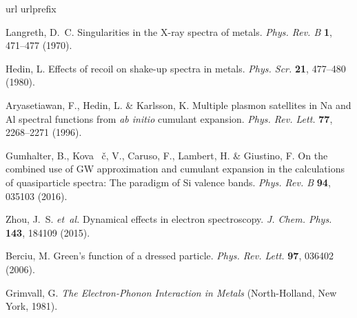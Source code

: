 \documentclass[12pt]{nature-mod}
\begin{document}
\begin{thebibliography}{10}
\expandafter\ifx\csname url\endcsname\relax
  \def\url#1{\texttt{#1}}\fi
\expandafter\ifx\csname urlprefix\endcsname\relax\def\urlprefix{URL }\fi
\providecommand{\bibinfo}[2]{#2}
\providecommand{\eprint}[2][]{\url{#2}}

\bibinfo{author}{Langreth, D.~C.}
\newblock \bibinfo{title}{Singularities in the {X}-ray spectra of metals}.
\newblock \emph{\bibinfo{journal}{Phys. Rev. B}} \textbf{\bibinfo{volume}{1}},
  \bibinfo{pages}{471--477} (\bibinfo{year}{1970}).

\bibinfo{author}{Hedin, L.}
\newblock \bibinfo{title}{Effects of recoil on shake-up spectra in metals}.
\newblock \emph{\bibinfo{journal}{Phys. Scr.}} \textbf{\bibinfo{volume}{21}},
  \bibinfo{pages}{477--480} (\bibinfo{year}{1980}).

\bibinfo{author}{Aryasetiawan, F.}, \bibinfo{author}{Hedin, L.} \&
  \bibinfo{author}{Karlsson, K.}
\newblock \bibinfo{title}{Multiple plasmon satellites in {Na} and {Al} spectral
  functions from \textit{ab initio} cumulant expansion}.
\newblock \emph{\bibinfo{journal}{Phys. Rev. Lett.}}
  \textbf{\bibinfo{volume}{77}}, \bibinfo{pages}{2268--2271}
  (\bibinfo{year}{1996}).

\bibinfo{author}{Gumhalter, B.}, \bibinfo{author}{Kova\ifmmode~\else
  \v{c}\fi{}, V.}, \bibinfo{author}{Caruso, F.}, \bibinfo{author}{Lambert, H.}
  \& \bibinfo{author}{Giustino, F.}
\newblock \bibinfo{title}{On the combined use of {GW} approximation and
  cumulant expansion in the calculations of quasiparticle spectra: The paradigm
  of {Si} valence bands}.
\newblock \emph{\bibinfo{journal}{Phys. Rev. B}} \textbf{\bibinfo{volume}{94}},
  \bibinfo{pages}{035103} (\bibinfo{year}{2016}).

\bibinfo{author}{Zhou, J.~S.} \emph{et~al.}
\newblock \bibinfo{title}{Dynamical effects in electron spectroscopy}.
\newblock \emph{\bibinfo{journal}{J. Chem. Phys.}}
  \textbf{\bibinfo{volume}{143}}, \bibinfo{pages}{184109}
  (\bibinfo{year}{2015}).

\bibinfo{author}{Berciu, M.}
\newblock \bibinfo{title}{Green's function of a dressed particle}.
\newblock \emph{\bibinfo{journal}{Phys. Rev. Lett.}}
  \textbf{\bibinfo{volume}{97}}, \bibinfo{pages}{036402}
  (\bibinfo{year}{2006}).

\bibinfo{author}{Grimvall, G.}
\newblock \emph{\bibinfo{title}{The Electron-Phonon Interaction in Metals}}
  (\bibinfo{publisher}{North-Holland}, \bibinfo{address}{New York},
  \bibinfo{year}{1981}).


\end{thebibliography}
\end{document}
